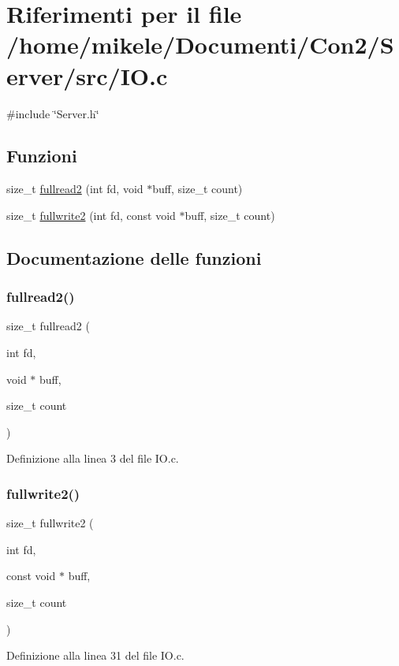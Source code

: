 \hypertarget{a00020}{}\section{Riferimenti per il file /home/mikele/\+Documenti/\+Con2/\+Server/src/\+IO.c}
\label{a00020}
{\ttfamily \#include \char`\"{}Server.\+h\char`\"{}}\newline
\subsection*{Funzioni}
\begin{DoxyCompactItemize}
\item 
size\+\_\+t \mbox{\hyperlink{a00020_a8e850cb6d1a947f1a5e958ac79e7e121}{fullread2}} (int fd, void $\ast$buff, size\+\_\+t count)
\item 
size\+\_\+t \mbox{\hyperlink{a00020_afce138124de55af81761378205999bf6}{fullwrite2}} (int fd, const void $\ast$buff, size\+\_\+t count)
\end{DoxyCompactItemize}


\subsection{Documentazione delle funzioni}
\mbox{\label{a00020_a8e850cb6d1a947f1a5e958ac79e7e121}} 
\subsubsection{\texorpdfstring{fullread2()}{fullread2()}}
{\footnotesize\ttfamily size\+\_\+t fullread2 (\begin{DoxyParamCaption}\item[{int}]{fd,  }\item[{void $\ast$}]{buff,  }\item[{size\+\_\+t}]{count }\end{DoxyParamCaption})}



Definizione alla linea 3 del file I\+O.\+c.

\mbox{\label{a00020_afce138124de55af81761378205999bf6}} 
\subsubsection{\texorpdfstring{fullwrite2()}{fullwrite2()}}
{\footnotesize\ttfamily size\+\_\+t fullwrite2 (\begin{DoxyParamCaption}\item[{int}]{fd,  }\item[{const void $\ast$}]{buff,  }\item[{size\+\_\+t}]{count }\end{DoxyParamCaption})}



Definizione alla linea 31 del file I\+O.\+c.

